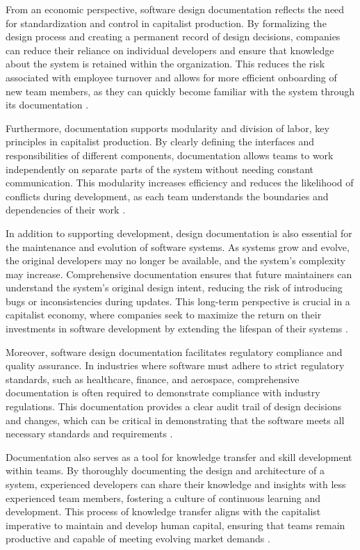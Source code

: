 \begin{refsection}
From an economic perspective, software design documentation reflects the need for standardization and control in capitalist production. By formalizing the design process and creating a permanent record of design decisions, companies can reduce their reliance on individual developers and ensure that knowledge about the system is retained within the organization. This reduces the risk associated with employee turnover and allows for more efficient onboarding of new team members, as they can quickly become familiar with the system through its documentation \cite[pp.~78-81]{Pressman2019}.

Furthermore, documentation supports modularity and division of labor, key principles in capitalist production. By clearly defining the interfaces and responsibilities of different components, documentation allows teams to work independently on separate parts of the system without needing constant communication. This modularity increases efficiency and reduces the likelihood of conflicts during development, as each team understands the boundaries and dependencies of their work \cite[pp.~137-139]{Bass2021}.

In addition to supporting development, design documentation is also essential for the maintenance and evolution of software systems. As systems grow and evolve, the original developers may no longer be available, and the system's complexity may increase. Comprehensive documentation ensures that future maintainers can understand the system's original design intent, reducing the risk of introducing bugs or inconsistencies during updates. This long-term perspective is crucial in a capitalist economy, where companies seek to maximize the return on their investments in software development by extending the lifespan of their systems \cite[pp.~110-113]{Larman2002}.

Moreover, software design documentation facilitates regulatory compliance and quality assurance. In industries where software must adhere to strict regulatory standards, such as healthcare, finance, and aerospace, comprehensive documentation is often required to demonstrate compliance with industry regulations. This documentation provides a clear audit trail of design decisions and changes, which can be critical in demonstrating that the software meets all necessary standards and requirements \cite[pp.~202-205]{Pfleeger2006}.

Documentation also serves as a tool for knowledge transfer and skill development within teams. By thoroughly documenting the design and architecture of a system, experienced developers can share their knowledge and insights with less experienced team members, fostering a culture of continuous learning and development. This process of knowledge transfer aligns with the capitalist imperative to maintain and develop human capital, ensuring that teams remain productive and capable of meeting evolving market demands \cite[pp.~150-153]{Pressman2019}.


\end{refsection}
